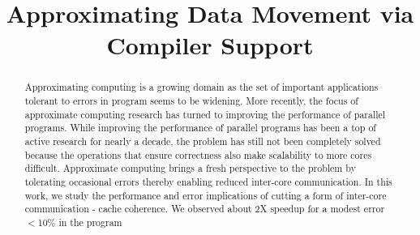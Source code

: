 \documentclass[12pt,conference]{IEEEtran}
\begin{document}
%
\title{Approximating Data Movement via Compiler Support}


\author{
\and
{}
}



\maketitle

\begin{abstract}
Approximating computing is a growing domain as the set of important applications
tolerant to errors in program seems to be widening. More recently, the 
focus of approximate computing research has turned to improving 
the performance of parallel programs. While improving the performance
of parallel programs has been a top of active research for nearly a decade,
the problem has still not been completely solved because the operations
that ensure correctness also make scalability to more cores difficult. 
Approximate computing brings a fresh perspective to the problem by tolerating
occasional errors thereby enabling reduced inter-core communication. 
In this work, we study the performance and error implications of cutting a 
form of inter-core communication - cache coherence. We observed about 2X speedup for
a modest error $<$10\% in the program

 


\end{abstract}
\end{document}
